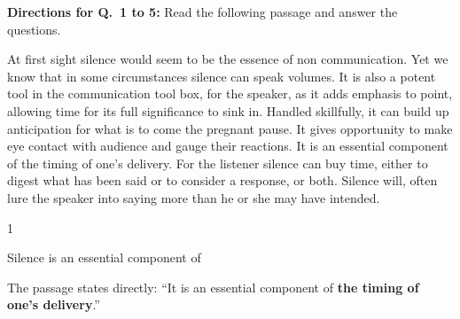 \begin{context}
\textbf{Directions for Q.~1 to 5:} Read the following passage and answer the questions.\par\smallskip
At first sight silence would seem to be the essence of non communication. Yet we know that in some circumstances silence can speak volumes. It is also a potent tool in the communication tool box, for the speaker, as it adds emphasis to point, allowing time for its full significance to sink in. Handled skillfully, it can build up anticipation for what is to come the pregnant pause. It gives opportunity to make eye contact with audience and gauge their reactions. It is an essential component of the timing of one's delivery. For the listener silence can buy time, either to digest what has been said or to consider a response, or both. Silence will, often lure the speaker into saying more than he or she may have intended.
\end{context}
\begin{question}{1}
{Silence is an essential component of\par}
\begin{explain}
The passage states directly: ``It is an essential component of \textbf{the timing of one's delivery}.''
\end{explain}
\end{question}

